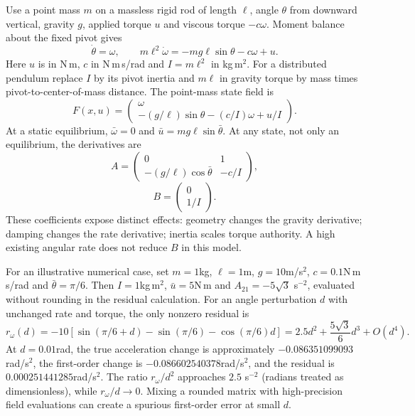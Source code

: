 Use a point mass $m$ on a massless rigid rod of length $\ell$, angle $\theta$ from downward
vertical, gravity $g$, applied torque $u$ and viscous torque $-c\omega$. Moment balance about
the fixed pivot gives
\begin{equation}
\dot\theta=\omega,\qquad m\ell^2\dot\omega=-mg\ell\sin\theta-c\omega+u.
\label{eq:ch1:pendulum-dyn}
\end{equation}
Here $u$ is in N\,m, $c$ in N\,m\,s/rad and $I=m\ell^2$ in kg\,m$^2$. For a distributed
pendulum replace $I$ by its pivot inertia and $m\ell$ in gravity torque by mass times
pivot-to-center-of-mass distance. The point-mass state field is
\begin{equation}
F(x,u)=\begin{pmatrix}\omega\\-(g/\ell)\sin\theta-(c/I)\omega+u/I\end{pmatrix}.
\label{eq:ch1:pendulum-f}
\end{equation}
At a static equilibrium, $\bar\omega=0$ and $\bar u=mg\ell\sin\bar\theta$. At any state,
not only an equilibrium, the derivatives are
\begin{equation}
A=\begin{pmatrix}0&1\\-(g/\ell)\cos\bar\theta&-c/I\end{pmatrix},
\label{eq:ch1:pendulum-A}
\end{equation}
\begin{equation}
B=\begin{pmatrix}0\\1/I\end{pmatrix}.
\label{eq:ch1:pendulum-B}
\end{equation}
These coefficients expose distinct effects: geometry changes the gravity derivative;
damping changes the rate derivative; inertia scales torque authority. A high existing
angular rate does not reduce $B$ in this model.

For an illustrative numerical case, set $m=1$kg, $\ell=1$m, $g=10$m/s$^2$,
$c=0.1$N\,m\,s/rad and $\bar\theta=\pi/6$. Then $I=1$kg\,m$^2$, $\bar u=5$N\,m and
$A_{21}=-5\sqrt3$ s$^{-2}$, evaluated without rounding in the residual calculation.
For an angle perturbation $d$ with unchanged rate and torque, the only nonzero residual is
\[
r_\omega(d)=-10[\sin(\pi/6+d)-\sin(\pi/6)-\cos(\pi/6)d]
=2.5d^2+\frac{5\sqrt3}{6}d^3+O(d^4).
\]
At $d=0.01$rad, the true acceleration change is approximately $-0.086351099093$rad/s$^2$,
the first-order change is $-0.086602540378$rad/s$^2$, and the residual is
$0.000251441285$rad/s$^2$. The ratio $r_\omega/d^2$ approaches $2.5$ s$^{-2}$ (radians treated as dimensionless), while
$r_\omega/d\to0$. Mixing a rounded matrix with high-precision field evaluations can
create a spurious first-order error at small $d$.

